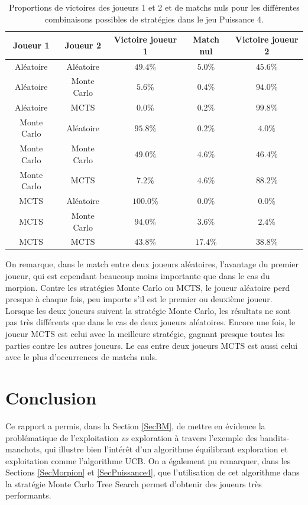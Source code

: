 \documentclass[a4paper,12pt]{article}
\begin{document}
\begin{table}[ht]
\centering
\begin{tabular}{cc|ccc}
\hline\hline
Joueur 1 & Joueur 2 & Victoire joueur 1 & Match nul & Victoire joueur 2 \tabularnewline
\hline
Aléatoire & Aléatoire &     $49.4\%$ & $5.0\%$ & $45.6\%$ \tabularnewline
Aléatoire & Monte Carlo &   $5.6\%$ & $0.4\%$ & $94.0\%$ \tabularnewline
Aléatoire & MCTS &          $0.0\%$ & $0.2\%$ & $99.8\%$ \tabularnewline
Monte Carlo & Aléatoire &   $95.8\%$ & $0.2\%$ & $4.0\%$ \tabularnewline
Monte Carlo & Monte Carlo & $49.0\%$ & $4.6\%$ & $46.4\%$ \tabularnewline
Monte Carlo & MCTS &        $7.2\%$ & $4.6\%$ & $88.2\%$ \tabularnewline
MCTS & Aléatoire &          $100.0\%$ & $0.0\%$ & $0.0\%$ \tabularnewline
MCTS & Monte Carlo &        $94.0\%$ & $3.6\%$ & $2.4\%$ \tabularnewline
MCTS & MCTS &               $43.8\%$ & $17.4\%$ & $38.8\%$ \tabularnewline
\hline\hline
\end{tabular}
\caption{Proportions de victoires des joueurs 1 et 2 et de matchs nuls pour les différentes combinaisons possibles de stratégies dans le jeu Puissance 4.}
\label{TabP4}
\end{table}

On remarque, dans le match entre deux joueurs aléatoires, l'avantage du premier joueur, qui est cependant beaucoup moins importante que dans le cas du morpion. Contre les stratégies Monte Carlo ou MCTS, le joueur aléatoire perd presque à chaque fois, peu importe s'il est le premier ou deuxième joueur. Lorsque les deux joueurs suivent la stratégie Monte Carlo, les résultats ne sont pas très différents que dans le cas de deux joueurs aléatoires. Encore une fois, le joueur MCTS est celui avec la meilleure stratégie, gagnant presque toutes les parties contre les autres joueurs. Le cas entre deux joueurs MCTS est aussi celui avec le plus d'occurrences de matchs nuls.


\section{Conclusion}

Ce rapport a permis, dans la Section \ref{SecBM}, de mettre en évidence la problématique de l'exploitation \emph{vs} exploration à travers l'exemple des bandits-manchots, qui illustre bien l'intérêt d'un algorithme équilibrant exploration et exploitation comme l'algorithme UCB. On a également pu remarquer, dans les Sections \ref{SecMorpion} et \ref{SecPuissance4}, que l'utilisation de cet algorithme dans la stratégie Monte Carlo Tree Search permet d'obtenir des joueurs très performants.
\end{document}
